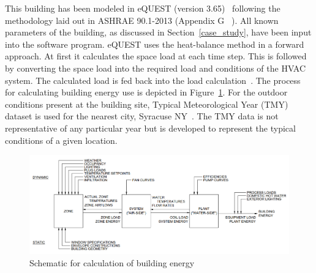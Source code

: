 \begin{table}[H]
\begin{center}
\caption{BEM Inputs per Zone - Conduction through Surfaces Only}
\label{zonetable}
\end{center}
\end{table}

This building has been modeled in eQUEST (version 3.65)~\citep{hirsch2006equest} following the methodology laid out in ASHRAE 90.1-2013 (Appendix G ~\citep{american90}).  All known parameters of the building, as discussed in Section~\ref{case_study}, have been input into the software program. eQUEST uses the heat-balance method in a forward approach. At first it calculates the space load at each time step. This is followed by converting the space load into the required load and conditions of the HVAC system. The calculated load is fed back into the load calculation~\citep{hirsch2003doe}.  The process for calculating building energy use is depicted in Figure~\ref{process}. For the outdoor conditions present at the building site, Typical Meteorological Year (TMY) dataset is used for the nearest city, Syracuse NY~\citep{marion1995user}. The TMY data is not representative of any particular year but is developed to represent the typical conditions of a given location.

\begin{figure}[H]
\centering
\includegraphics[scale=0.45]{jbs_figures/process}
\caption{Schematic for calculation of building energy}
\label{process}
\end{figure}

